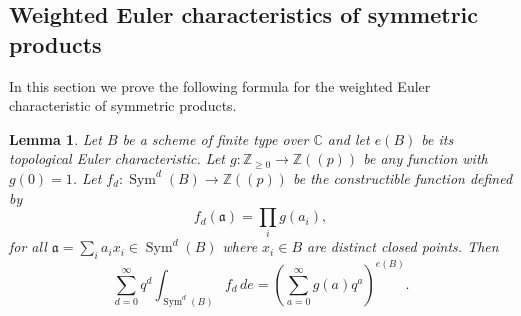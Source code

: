 \documentclass{amsart}
\newtheorem{lemma}[theorem]{Lemma}
\theoremstyle{definition}
\newcommand{\CC} {\mathbb{C}}          %
\newcommand{\ZZ} {\mathbb{Z}}		%
\newcommand{\Sym}{\operatorname{Sym}}
\begin{document}
\subsection{Weighted Euler characteristics of symmetric products} \label{power}

In this section we prove the following formula for the weighted Euler
characteristic of symmetric products.

\begin{lemma}\label{lem: formula for euler char of sym products}
Let $B$ be a scheme of finite type over $\CC $ and let $e (B)$ be its
topological Euler characteristic. Let $g:\ZZ _{\geq 0}\to \ZZ (\!(p)\!)$
be any function with $g (0)=1$. Let $f_{d}:\Sym ^{d} (B)\to \ZZ (\!(p)\!)$
be the constructible function defined by $$f_{d} (\mathfrak{a})=\prod _{i}g (a_{i}),$$ for all $\mathfrak{a} = \sum_{i}
a_{i}x_{i} \in \Sym^d(B)$ where $x_i \in B$ are distinct closed points. Then
\[
\sum _{d=0}^{\infty } q^{d} \int _{\Sym ^{d} (B)} f_{d} \, de =
\left(\sum _{a=0}^{\infty }g (a) q^{a} \right)^{e (B)}.
\]
\end{lemma}
\end{document}
